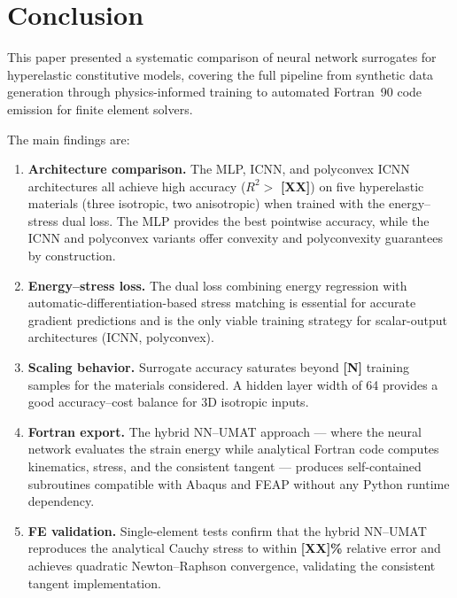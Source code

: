 \section{Conclusion}
\label{sec:conclusion}

This paper presented a systematic comparison of neural network surrogates for
hyperelastic constitutive models, covering the full pipeline from synthetic
data generation through physics-informed training to automated Fortran~90 code
emission for finite element solvers.

The main findings are:

\begin{enumerate}
  \item \textbf{Architecture comparison.}  The MLP, ICNN, and polyconvex ICNN
    architectures all achieve high accuracy ($R^2 > $
    \textbf{[XX]}) on five hyperelastic materials (three isotropic, two
    anisotropic) when trained with the energy--stress dual loss.  The MLP
    provides the best pointwise accuracy, while the ICNN and polyconvex
    variants offer convexity and polyconvexity guarantees by construction.

  \item \textbf{Energy--stress loss.}  The dual loss combining energy
    regression with automatic-differentiation-based stress matching is
    essential for accurate gradient predictions and is the only viable
    training strategy for scalar-output architectures (ICNN, polyconvex).

  \item \textbf{Scaling behavior.}  Surrogate accuracy saturates beyond
    \textbf{[N]} training samples for the materials considered.  A hidden
    layer width of 64 provides a good accuracy--cost balance for 3D isotropic
    inputs.

  \item \textbf{Fortran export.}  The hybrid NN--UMAT approach --- where the
    neural network evaluates the strain energy while analytical Fortran code
    computes kinematics, stress, and the consistent tangent --- produces
    self-contained subroutines compatible with Abaqus and FEAP without any
    Python runtime dependency.

  \item \textbf{FE validation.}  Single-element tests confirm that the hybrid
    NN--UMAT reproduces the analytical Cauchy stress to within
    \textbf{[XX]\%} relative error and achieves quadratic Newton--Raphson
    convergence, validating the consistent tangent implementation.
\end{enumerate}

